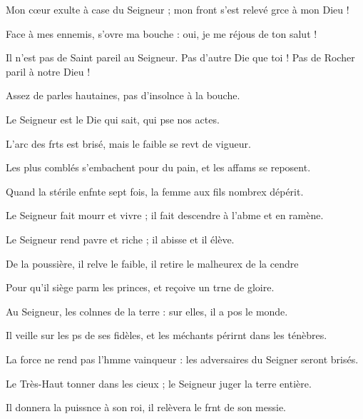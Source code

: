 \item Mon cœur exulte à case du Seigneur ;\psstar{} mon front s’est relevé grce à mon Dieu !
\item Face à mes ennemis, s’ovre ma bouche :\psstar{} oui, je me réjous de ton salut !
\item Il n’est pas de Saint pareil au Seigneur.\pscross{} Pas d’autre Die que toi !\psstar{} Pas de Rocher paril à notre Dieu !
\item Assez de parles hautaines,\psstar{} pas d’insolnce à la bouche.
\item Le Seigneur est le Die qui sait,\psstar{} qui pse nos actes.
\item L’arc des frts est brisé,\psstar{} mais le faible se revt de vigueur.
\item Les plus comblés s’embachent pour du pain,\psstar{} et les affams se reposent.
\item Quand la stérile enfnte sept fois,\psstar{} la femme aux fils nombrex dépérit.
\item Le Seigneur fait mourr et vivre ;\psstar{} il fait descendre à l’abme et en ramène.
\item Le Seigneur rend pavre et riche ;\psstar{} il abisse et il élève.
\item De la poussière, il relve le faible,\psstar{} il retire le malheurex de la cendre
\item Pour qu’il siège parm les princes,\psstar{} et reçoive un trne de gloire.
\item Au Seigneur, les colnnes de la terre :\psstar{} sur elles, il a pos le monde.
\item Il veille sur les ps de ses fidèles,\psstar{} et les méchants périrnt dans les ténèbres.
\item La force ne rend pas l’hmme vainqueur :\psstar{} les adversaires du Seigner seront brisés.
\item Le Très-Haut tonner dans les cieux ;\psstar{} le Seigneur juger la terre entière.
\item Il donnera la puissnce à son roi,\psstar{} il relèvera le frnt de son messie.
